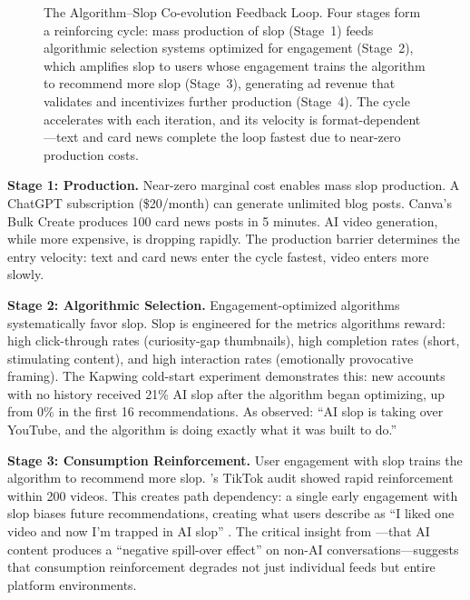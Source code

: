 \documentclass[12pt,a4paper]{article}
\begin{document}
\begin{figure}[htbp]
\caption{The Algorithm--Slop Co-evolution Feedback Loop. Four stages form a reinforcing cycle: mass production of slop (Stage~1) feeds algorithmic selection systems optimized for engagement (Stage~2), which amplifies slop to users whose engagement trains the algorithm to recommend more slop (Stage~3), generating ad revenue that validates and incentivizes further production (Stage~4). The cycle accelerates with each iteration, and its velocity is format-dependent---text and card news complete the loop fastest due to near-zero production costs.}
\label{fig:coevolution}
\end{figure}

\textbf{Stage 1: Production.} Near-zero marginal cost enables mass slop production. A ChatGPT subscription (\$20/month) can generate unlimited blog posts. Canva's Bulk Create produces 100 card news posts in 5 minutes. AI video generation, while more expensive, is dropping rapidly. The production barrier determines the entry velocity: text and card news enter the cycle fastest, video enters more slowly.

\textbf{Stage 2: Algorithmic Selection.} Engagement-optimized algorithms systematically favor slop. Slop is engineered for the metrics algorithms reward: high click-through rates (curiosity-gap thumbnails), high completion rates (short, stimulating content), and high interaction rates (emotionally provocative framing). The Kapwing cold-start experiment demonstrates this: new accounts with no history received 21\% AI slop after the algorithm began optimizing, up from 0\% in the first 16 recommendations. As \textcite{SEJ2026} observed: ``AI slop is taking over YouTube, and the algorithm is doing exactly what it was built to do.''

\textbf{Stage 3: Consumption Reinforcement.} User engagement with slop trains the algorithm to recommend more slop. \textcite{Baumann2026}'s TikTok audit showed rapid reinforcement within 200 videos. This creates path dependency: a single early engagement with slop biases future recommendations, creating what users describe as ``I liked one video and now I'm trapped in AI slop'' \parencite{Dexerto2026}. The critical insight from \textcite{Moller2026}---that AI content produces a ``negative spill-over effect'' on non-AI conversations---suggests that consumption reinforcement degrades not just individual feeds but entire platform environments.
\end{document}
